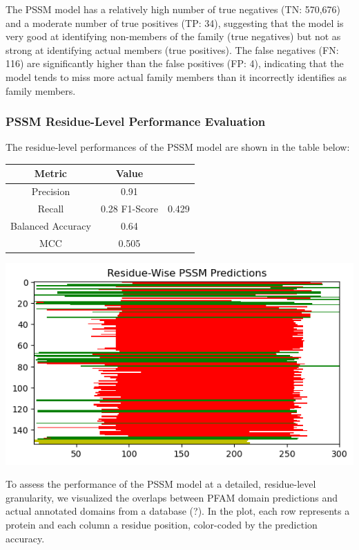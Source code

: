 \documentclass[10pt,twocolumn,letterpaper]{article}
\begin{document}
The PSSM model has a relatively high number of true negatives (TN: 570,676) and a moderate number of true positives (TP: 34), suggesting that the model is very good at identifying non-members of the family (true negatives) but not as strong at identifying actual members (true positives). The false negatives (FN: 116) are significantly higher than the false positives (FP: 4), indicating that the model tends to miss more actual family members than it incorrectly identifies as family members.

\subsubsection{PSSM Residue-Level Performance Evaluation}

The residue-level performances of the PSSM model are shown in the table below:



\begin{center}
    \begin{tabular}{ccc}
        \toprule
        Metric & Value \\
        \midrule
        Precision & 0.91 \\
        Recall & 0.28
        F1-Score & 0.429 \\
        Balanced Accuracy & 0.64 \\
        MCC & 0.505 \\
        \bottomrule
    \end{tabular}
\end{center} 

\begin{center}
    \includegraphics[scale=0.4]{img/pssm_residue_level_eval.png}
\end{center}

To assess the performance of the PSSM model at a detailed, residue-level granularity,
we visualized the overlaps between PFAM domain predictions and actual annotated domains from a database (?). In the plot, each row represents a protein and each column a residue position, color-coded by the prediction accuracy. 
\end{document}
